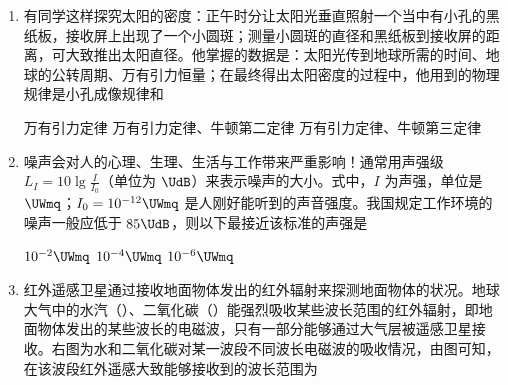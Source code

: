 \documentclass[\gkver]{gaokaozhenti}
\begin{document}
\begin{enumerate}

{磁铁插向右环，横杆发生转动}
{无论磁铁插向左环还是右环，横杆都不发生转动}
{无论磁铁插向左环还是右环，横杆都发生转动}


\item
有同学这样探究太阳的密度：正午时分让太阳光垂直照射一个当中有小孔的黑纸板，接收屏上出现了一个小圆斑；测量小圆斑的直径和黑纸板到接收屏的距离，可大致推出太阳直径。他掌握的数据是：太阳光传到地球所需的时间、地球的公转周期、万有引力恒量；在最终得出太阳密度的过程中，他用到的物理规律是小孔成像规律和

{万有引力定律}
{万有引力定律、牛顿第二定律}
{万有引力定律、牛顿第三定律}


\item
噪声会对人的心理、生理、生活与工作带来严重影响！通常用声强级 $L_{I}=10\lg\frac{I}{I_{0}}$（单位为 $\UdB$）来表示噪声的大小。式中，$I$ 为声强，单位是 $\UWmq$；$I_{0}=10^{-12}\UWmq$ 是人刚好能听到的声音强度。我国规定工作环境的噪声一般应低于 $85\UdB$，则以下最接近该标准的声强是

{$10^{-2}\UWmq$}
{$10^{-4}\UWmq$}
{$10^{-6}\UWmq$}


\item
红外遥感卫星通过接收地面物体发出的红外辐射来探测地面物体的状况。地球大气中的水汽（）、二氧化碳（）能强烈吸收某些波长范围的红外辐射，即地面物体发出的某些波长的电磁波，只有一部分能够通过大气层被遥感卫星接收。右图为水和二氧化碳对某一波段不同波长电磁波的吸收情况，由图可知，在该波段红外遥感大致能够接收到的波长范围为


\end{enumerate}
\end{document}
